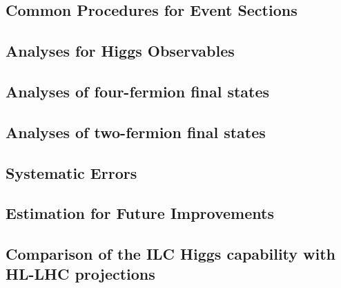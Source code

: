 


\subsection{Common Procedures for Event Sections}



\subsection{Analyses for Higgs Observables}


\subsection{Analyses of four-fermion final states} 


\subsection{Analyses of two-fermion final states}


\subsection{Systematic Errors}



\subsection{Estimation for Future Improvements}



\subsection{Comparison of the ILC Higgs capability with 
HL-LHC projections}



